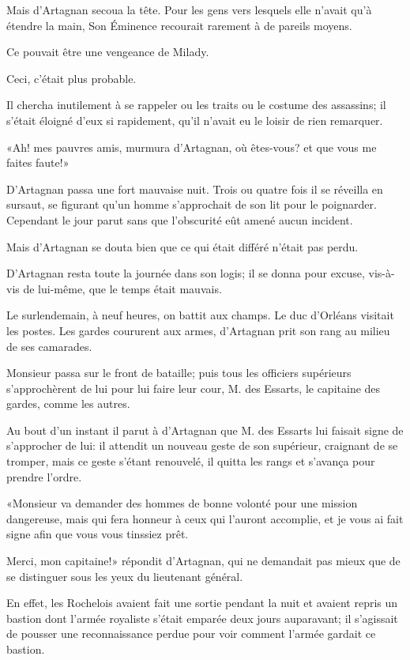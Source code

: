 Mais d'Artagnan secoua la tête. Pour les gens vers lesquels elle n'avait qu'à étendre la main, Son Éminence recourait rarement à de pareils moyens. 

Ce pouvait être une vengeance de Milady. 

Ceci, c'était plus probable. 

Il chercha inutilement à se rappeler ou les traits ou le costume des assassins; il s'était éloigné d'eux si rapidement, qu'il n'avait eu le loisir de rien remarquer. 

«Ah! mes pauvres amis, murmura d'Artagnan, où êtes-vous? et que vous me faites faute!» 

D'Artagnan passa une fort mauvaise nuit. Trois ou quatre fois il se réveilla en sursaut, se figurant qu'un homme s'approchait de son lit pour le poignarder. Cependant le jour parut sans que l'obscurité eût amené aucun incident. 

Mais d'Artagnan se douta bien que ce qui était différé n'était pas perdu. 

D'Artagnan resta toute la journée dans son logis; il se donna pour excuse, vis-à-vis de lui-même, que le temps était mauvais. 

Le surlendemain, à neuf heures, on battit aux champs. Le duc d'Orléans visitait les postes. Les gardes coururent aux armes, d'Artagnan prit son rang au milieu de ses camarades. 

Monsieur passa sur le front de bataille; puis tous les officiers supérieurs s'approchèrent de lui pour lui faire leur cour, M. des Essarts, le capitaine des gardes, comme les autres. 

Au bout d'un instant il parut à d'Artagnan que M. des Essarts lui faisait signe de s'approcher de lui: il attendit un nouveau geste de son supérieur, craignant de se tromper, mais ce geste s'étant renouvelé, il quitta les rangs et s'avança pour prendre l'ordre. 

«Monsieur va demander des hommes de bonne volonté pour une mission dangereuse, mais qui fera honneur à ceux qui l'auront accomplie, et je vous ai fait signe afin que vous vous tinssiez prêt. 

\speak  Merci, mon capitaine!» répondit d'Artagnan, qui ne demandait pas mieux que de se distinguer sous les yeux du lieutenant général. 

En effet, les Rochelois avaient fait une sortie pendant la nuit et avaient repris un bastion dont l'armée royaliste s'était emparée deux jours auparavant; il s'agissait de pousser une reconnaissance perdue pour voir comment l'armée gardait ce bastion. 

